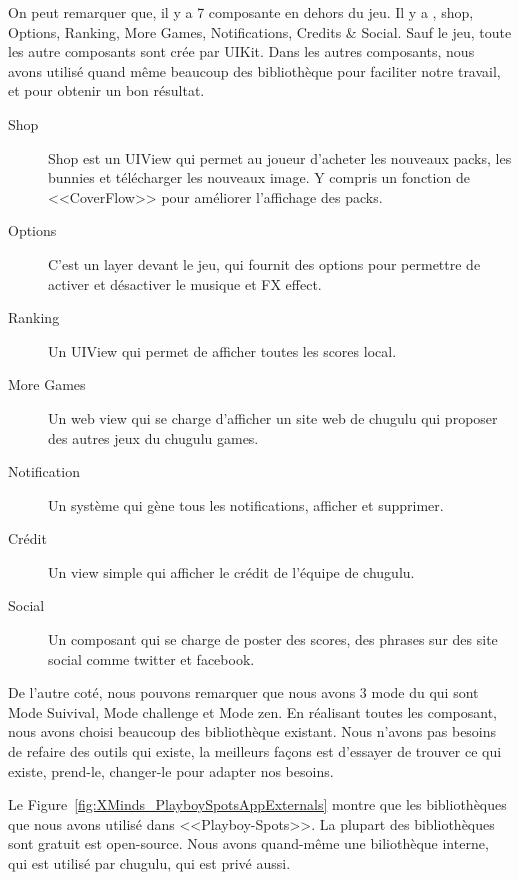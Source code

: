 On peut remarquer que, il y a 7 composante en dehors du jeu. Il y a , shop, Options, Ranking, More Games, Notifications, Credits \& Social. Sauf le jeu, toute les autre composants sont crée par UIKit. Dans les autres composants, nous avons utilisé quand même beaucoup des bibliothèque pour faciliter notre travail, et pour obtenir un bon résultat.

\begin{description}
	\item[Shop] Shop est un UIView qui permet au joueur d'acheter les nouveaux packs, les bunnies et télécharger les nouveaux image. Y compris un fonction de <<CoverFlow>> pour améliorer l'affichage des packs.
	\item[Options] C'est un layer devant le jeu, qui fournit des options pour permettre de activer et désactiver le musique et FX effect.
	\item[Ranking] Un UIView qui permet de afficher toutes les scores local.
	\item[More Games] Un web view qui se charge d'afficher un site web de chugulu qui proposer des autres jeux du chugulu games.
	\item[Notification] Un système qui gène tous les notifications, afficher et supprimer.
	\item[Crédit] Un view simple qui afficher le crédit de l'équipe de chugulu.
	\item[Social] Un composant qui se charge de poster des scores, des phrases sur des site social comme twitter et facebook.
\end{description}


De l'autre coté, nous pouvons remarquer que nous avons 3 mode du qui sont Mode Suivival, Mode challenge et Mode zen. En réalisant toutes les composant, nous avons choisi beaucoup des bibliothèque existant. Nous n'avons pas besoins de refaire des outils qui existe, la meilleurs façons est d'essayer de trouver ce qui existe, prend-le, changer-le pour adapter nos besoins.

Le Figure~\ref{fig:XMinds_PlayboySpotsAppExternals} montre que les bibliothèques que nous avons utilisé dans <<Playboy-Spots>>. La plupart des bibliothèques sont gratuit est open-source. Nous avons quand-même une biliothèque interne, qui est utilisé par chugulu, qui est privé aussi. 

